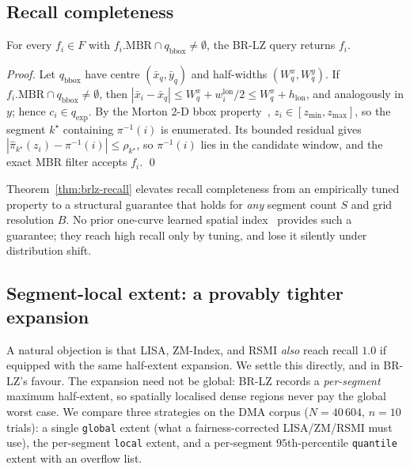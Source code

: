 \subsection{Recall completeness}
\begin{theorem}\label{thm:brlz-recall}
For every $f_i\in F$ with
$f_i.\mathrm{MBR}\cap q_{\mathrm{bbox}}\neq\emptyset$, the BR-LZ query
returns $f_i$.
\end{theorem}
\begin{proof}
Let $q_{\mathrm{bbox}}$ have centre $(\bar x_q,\bar y_q)$ and half-widths
$(W_q^x,W_q^y)$. If $f_i.\mathrm{MBR}\cap q_{\mathrm{bbox}}\neq\emptyset$,
then $|\bar x_i-\bar x_q|\le W_q^x+w_i^{\mathrm{lon}}/2\le
W_q^x+h_{\mathrm{lon}}$, and analogously in $y$; hence
$c_i\in q_{\mathrm{exp}}$. By the Morton 2-D bbox
property~\cite{moon2001hilbert}, $z_i\in[z_{\min},z_{\max}]$, so the
segment $k^\star$ containing $\pi^{-1}(i)$ is enumerated. Its bounded
residual gives $|\hat\pi_{k^\star}(z_i)-\pi^{-1}(i)|\le\rho_{k^\star}$, so
$\pi^{-1}(i)$ lies in the candidate window, and the exact MBR filter
accepts $f_i$. \qed
\end{proof}

\noindent Theorem~\ref{thm:brlz-recall} elevates recall completeness from
an empirically tuned property to a structural guarantee that holds for
\emph{any} segment count $S$ and grid resolution $B$. No prior one-curve
learned spatial index~\cite{wang2019learnedz,li2020lisa,qi2020rsmi}
provides such a guarantee; they reach high recall only by tuning, and
lose it silently under distribution shift.

\subsection{Segment-local extent: a provably tighter expansion}\label{ssec:extent}
A natural objection is that LISA, ZM-Index, and RSMI \emph{also} reach
recall $1.0$ if equipped with the same half-extent expansion. We settle
this directly, and in BR-LZ's favour. The expansion need not be global:
BR-LZ records a \emph{per-segment} maximum half-extent, so spatially
localised dense regions never pay the global worst case. We compare three
strategies on the DMA corpus ($N\!=\!40\,604$, $n\!=\!10$ trials): a
single \texttt{global} extent (what a fairness-corrected
LISA/ZM/RSMI must use), the per-segment \texttt{local} extent, and a
per-segment $95$th-percentile \texttt{quantile} extent with an overflow
list.

